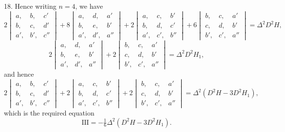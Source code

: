 \documentclass[11pt]{article}
\begin{document}
18. Hence writing $n = 4$, we have
\[
2\begin{vmatrix} a, & b, & c'\\ b, & c, & d'\\ a', & b', & c'' \end{vmatrix} + 8\begin{vmatrix} a, & d, & a'\\ b, & e, & b'\\ a', & d', & a'' \end{vmatrix} + 2\begin{vmatrix} a, & c, & b'\\ b, & d, & c'\\ a', & c', & b'' \end{vmatrix} + 6\begin{vmatrix} b, & c, & a'\\ c, & d, & b'\\ b', & c', & a'' \end{vmatrix} = \Delta^2 D^2 H,
\]
\[
2\begin{vmatrix} a, & d, & a'\\ b, & e, & b'\\ a', & d', & a'' \end{vmatrix} + 2\begin{vmatrix} b, & c, & a'\\ c, & d, & b'\\ b', & c', & a'' \end{vmatrix} = \Delta^2 D^2 H_1,
\]
and hence
\[
2\begin{vmatrix} a, & b, & c'\\ b, & c, & d'\\ a', & b', & c'' \end{vmatrix} + 2\begin{vmatrix} a, & c, & b'\\ b, & d, & c'\\ a', & c', & b'' \end{vmatrix} + 2\begin{vmatrix} b, & c, & a'\\ c, & d, & b'\\ b', & c', & a'' \end{vmatrix} = \Delta^2(D^2H - 3D^2H_1),
\]
which is the required equation
\[
\mathrm{III} = -\tfrac{1}{6}\Delta^2(D^2H - 3D^2H_1).
\]

\medskip
\end{document}
